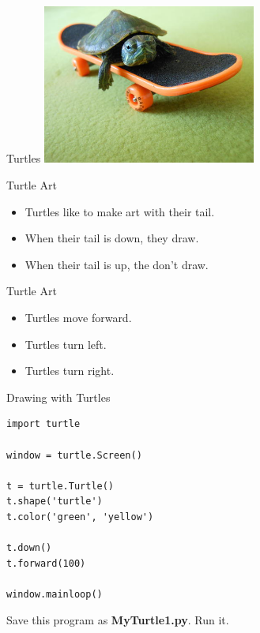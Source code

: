 \documentclass{beamer}
\begin{document}
\begin{frame}{Turtles}
\includegraphics[width=70mm]{images/turtle_skateboard.jpg}
\end{frame}

\begin{frame}{Turtle Art}

\begin{itemize}
\item Turtles like to make art with their tail.
\item When their tail is down, they draw.
\item When their tail is up, the don't draw.
\end{itemize}

\end{frame}

\begin{frame}{Turtle Art}

\begin{itemize}
\item Turtles move forward.
\item Turtles turn left.
\item Turtles turn right.
\end{itemize}

\end{frame}

\begin{frame}[fragile]{Drawing with Turtles}

\begin{verbatim}
import turtle

window = turtle.Screen()

t = turtle.Turtle()
t.shape('turtle')
t.color('green', 'yellow')

t.down()
t.forward(100)

window.mainloop()
\end{verbatim}

Save this program as \textbf{MyTurtle1.py}. Run it.
\end{frame}
\end{document}
